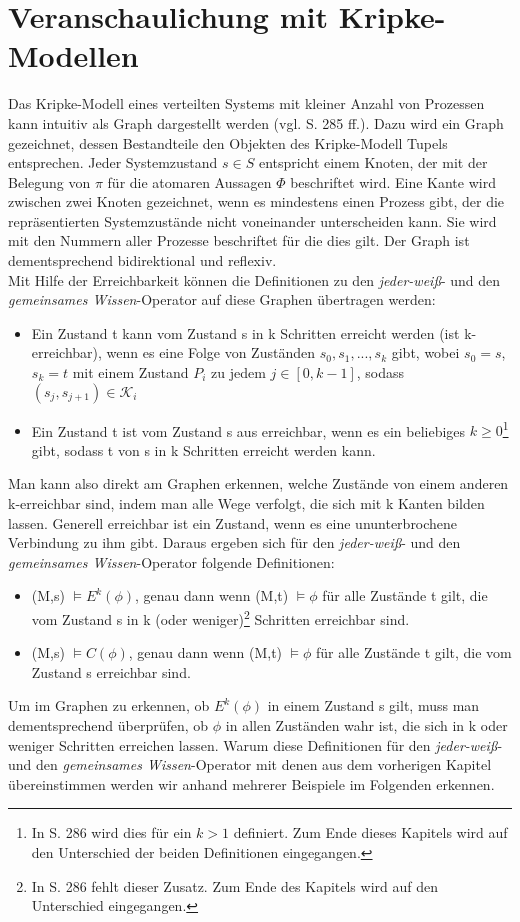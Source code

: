 \section{Veranschaulichung mit Kripke-Modellen}
\label{Kripke-Modelle}
Das Kripke-Modell eines verteilten Systems mit kleiner Anzahl von Prozessen kann intuitiv als Graph dargestellt werden (vgl. \cite{kshemkalyani2011distributed} S. 285 ff.).
Dazu wird ein Graph gezeichnet, dessen Bestandteile den Objekten des Kripke-Modell Tupels entsprechen.
Jeder Systemzustand $s\in S$ entspricht einem Knoten, der mit der Belegung von $\pi$ für die atomaren Aussagen $\Phi$ beschriftet wird. Eine Kante wird zwischen zwei Knoten gezeichnet, wenn es mindestens einen Prozess gibt, der die repräsentierten Systemzustände nicht voneinander unterscheiden kann. Sie wird mit den Nummern aller Prozesse beschriftet für die dies gilt.
Der Graph ist dementsprechend bidirektional und reflexiv.\\
Mit Hilfe der Erreichbarkeit können die Definitionen zu den \textit{jeder-weiß}- und den \textit{gemeinsames Wissen}-Operator auf diese Graphen übertragen werden:
\begin{itemize}
	\item Ein Zustand t kann vom Zustand s in k Schritten erreicht werden (ist k-erreichbar), wenn es eine Folge von Zuständen $s_0,s_1,...,s_k$ gibt, wobei $s_0 = s$, $s_k = t$ mit einem Zustand $P_i$ zu jedem $j\in [ 0,k-1 ]$, sodass $(s_j,s_{j+1})\in \mathcal{K}_i$
	\item Ein Zustand t ist vom Zustand s aus erreichbar, wenn es ein beliebiges $k \ge 0$\footnote{\label{note1}In \cite{kshemkalyani2011distributed} S. 286 wird dies für ein $k > 1$ definiert. Zum Ende dieses Kapitels wird auf den Unterschied der beiden Definitionen eingegangen.} gibt, sodass t von s in k Schritten erreicht werden kann.
\end{itemize}
Man kann also direkt am Graphen erkennen, welche Zustände von einem anderen k-erreichbar sind, indem man alle Wege verfolgt, die sich mit k Kanten bilden lassen.
Generell erreichbar ist ein Zustand, wenn es eine ununterbrochene Verbindung zu ihm gibt.
Daraus ergeben sich für den \textit{jeder-weiß}- und den \textit{gemeinsames Wissen}-Operator folgende Definitionen:
\begin{itemize}
	\item (M,s) $\vDash E^{k}(\phi)$, genau dann wenn (M,t) $\vDash \phi$ für alle Zustände t gilt, die vom Zustand s in k (oder weniger)\footnote{\label{note2}In \cite{kshemkalyani2011distributed} S. 286 fehlt dieser Zusatz. Zum Ende des Kapitels wird auf den Unterschied eingegangen.} Schritten erreichbar sind.
	\item (M,s) $\vDash C(\phi)$, genau dann wenn (M,t) $\vDash \phi$ für alle Zustände t gilt, die vom Zustand s erreichbar sind.
\end{itemize}
Um im Graphen zu erkennen, ob $E^{k}(\phi)$ in einem Zustand s gilt, muss man dementsprechend überprüfen, ob $\phi$ in allen Zuständen wahr ist, die sich in k oder weniger Schritten erreichen lassen. 
Warum diese Definitionen für den \textit{jeder-weiß}- und den \textit{gemeinsames Wissen}-Operator mit denen aus dem vorherigen Kapitel übereinstimmen werden wir anhand mehrerer Beispiele im Folgenden erkennen.


